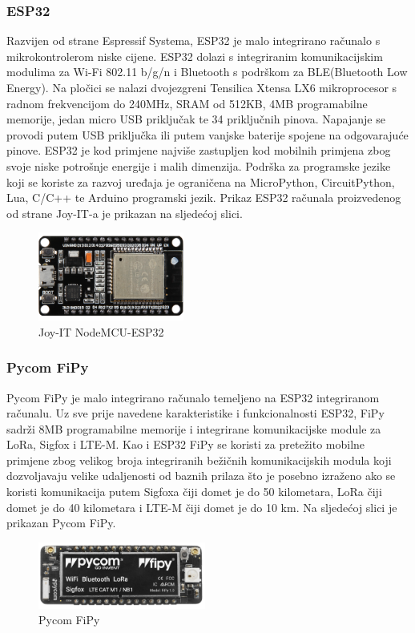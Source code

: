 \documentclass[times, utf8, diplomski]{fer}
\begin{document}
\subsubsection{ESP32}
Razvijen od strane Espressif Systema, ESP32\citep{ESP32} je malo integrirano računalo s mikrokontrolerom niske cijene. ESP32 dolazi s integriranim komunikacijskim modulima za Wi-Fi 802.11 b/g/n i Bluetooth s podrškom za BLE(Bluetooth Low Energy). Na pločici se nalazi dvojezgreni Tensilica Xtensa LX6 mikroprocesor s radnom frekvencijom do 240MHz, SRAM od 512KB, 4MB programabilne memorije, jedan micro USB priključak te 34 priključnih pinova. Napajanje se provodi putem USB priključka ili putem vanjske baterije spojene na odgovarajuće pinove. ESP32 je kod primjene najviše zastupljen kod mobilnih primjena zbog svoje niske potrošnje energije i malih dimenzija. Podrška za programske jezike koji se koriste za razvoj uređaja je ograničena na  MicroPython, CircuitPython, Lua, C/C++ te Arduino programski jezik. Prikaz ESP32 računala proizvedenog od strane Joy-IT-a je prikazan na sljedećoj slici.
\begin{figure}[H]
    \centering
    \includegraphics[width=4.8cm]{images/esp32.png}
    \caption{Joy-IT NodeMCU-ESP32\citep{ESP32Img}}
    \label{fig:esp32}
\end{figure}

\subsubsection{Pycom FiPy}
Pycom FiPy\citep{Fipy} je malo integrirano računalo temeljeno na ESP32 integriranom računalu. Uz sve prije navedene karakteristike i funkcionalnosti ESP32, FiPy sadrži 8MB programabilne memorije i integrirane komunikacijske module za LoRa, Sigfox i LTE-M. Kao i ESP32 FiPy se koristi za pretežito mobilne primjene zbog velikog broja integriranih bežičnih komunikacijskih modula koji dozvoljavaju velike udaljenosti od baznih prilaza što je posebno izraženo ako se koristi komunikacija putem Sigfoxa čiji domet je do 50 kilometara, LoRa čiji domet je do 40 kilometara i LTE-M čiji domet je do 10 km. Na sljedećoj slici je prikazan Pycom FiPy.
\begin{figure}[htb]
    \centering
    \includegraphics[width=5.5cm]{images/fipy.png}
    \caption{Pycom FiPy\citep{Fipy}}
    \label{fig:fipy}
\end{figure}
\end{document}

